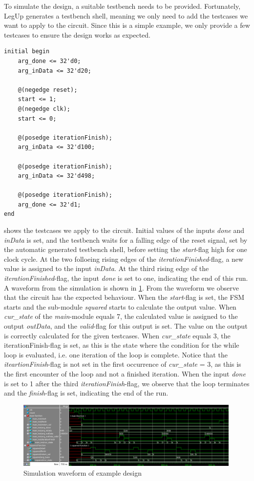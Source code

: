 To simulate the design, a suitable testbench needs to be provided. Fortunately, LegUp generates a testbench shell, meaning we only need to add the testcases we want to apply to the circuit. Since this is a simple example, we only provide a few testcases to ensure the design works as expected. 
\begin{lstlisting}[caption={Testcases for the example testbench},label=lst:tbcases]
initial begin
    arg_done <= 32'd0;
    arg_inData <= 32'd20;
    
    @(negedge reset);
    start <= 1;
    @(negedge clk);
    start <= 0;
    
    @(posedge iterationFinish);
    arg_inData <= 32'd100;
    
    @(posedge iterationFinish);
    arg_inData <= 32'd498;
    
    @(posedge iterationFinish);
    arg_done <= 32'd1;
end
\end{lstlisting}
 shows the testcases we apply to the circuit. Initial values of the inputs \textit{done} and \textit{inData} is set, and the testbench waits for a falling edge of the reset signal, set by the automatic generated testbench shell, before setting the \textit{start}-flag high for one clock cycle. At the two folloeing rising edges of the \textit{iterationFinished}-flag, a new value is assigned to the input \textit{inData}. At the third rising edge of the \textit{iterationFinished}-flag, the input \textit{done} is set to one, indicating the end of this run. A waveform from the simulation is shown in \cref{fig:simulationwave}. From the waveform we observe that the circuit has the expected behaviour. When the \textit{start}-flag is set, the FSM starts and the sub-module \textit{squared} starts to calculate the output value. When \textit{cur\_state} of the \textit{main}-module equals 7, the calculated value is assigned to the output \textit{outData}, and the \textit{valid}-flag for this output is set. The value on the output is correctly calculated for the given testcases. When \textit{cur\_state} equals 3, the {iterationFinish}-flag is set, as this is the state where the condition for the while loop is evaluated, i.e. one iteration of the loop is complete. Notice that the \textit{iteartionFinish}-flag is not set in the first occurrence of \textit{cur\_state} = 3, as this is the first encounter of the loop and not a finished iteration. When the input \textit{done} is set to 1 after the third \textit{iterationFinish}-flag, we observe that the loop terminates and the \textit{finish}-flag is set, indicating the end of the run.
\begin{figure}[hbpt]
\centering
\includegraphics[width=0.99\textwidth]{../figs/SimulationWaveEX.png}
\caption{\label{fig:simulationwave}Simulation waveform of example design}
\end{figure}
